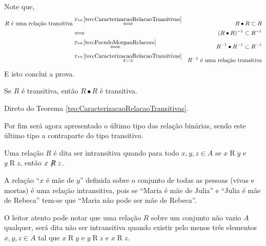 \begin{prova}
	Note que,
	\begin{eqnarray*}
		R \text{ é uma relação transitiva} & \stackrel{Teo. \ref{teo:CaracterizacaoRelacaoTransitivas}}{\Longleftrightarrow }& R \bullet R \subset R\\
		& \stackrel{ }{\Longleftrightarrow} & (R \bullet R)^{-1} \subset R^{-1}\\
		& \stackrel{Teo. \ref{teo:PseudoMorganRelacoes}}{\Longleftrightarrow} & R^{-1} \bullet R^{-1} \subset R^{-1}\\
		&  \stackrel{Teo. \ref{teo:CaracterizacaoRelacaoTransitivas}}{\Longleftrightarrow } & R^{-1} \text{ é uma relação transitiva}
	\end{eqnarray*}
	E isto conclui a prova.
\end{prova}

\begin{teorema}
	Se $R$ é transitiva, então $R \bullet R$ é transitiva.
\end{teorema}

\begin{prova}
	Direto do Teorema \ref{teo:CaracterizacaoRelacaoTransitivas}.
\end{prova}

Por fim será agora apresentado o último tipo das relação binárias, sendo este último tipo a contraparte do tipo transitivo.

\begin{definicao}\label{def::RelacaoIntransitiva}
	Uma relação $R$ é dita ser intransitiva quando para todo $x, y, z \in A$ se $x \mathrel{R} y$ e $y \mathrel{R} z$, então $x \centernot{R} z$.
\end{definicao}

\begin{exemplo}
	A relação ``$x$ é mãe de $y$'' definida sobre o conjunto de todas as pessoas (vivas e mortas) é uma relação intransitiva, pois se ``Maria é mãe de Julia'' e ``Julia é mãe de Rebeca'' tem-se que ``Maria não pode ser mãe de Rebeca''.
\end{exemplo}

O leitor atento pode notar que uma relação $R$ sobre um conjunto não vazio $A$ qualquer, será dita não ser intransitiva quando existir pelo menos três elementos $x, y, z \in A$ tal que $x \mathrel{R} y$ e $y \mathrel{R} z$ e $x \mathrel{R} z$.


